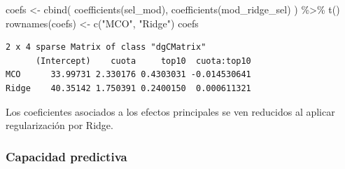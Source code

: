 \documentclass[
  letterpaper,
  DIV=11,
  numbers=noendperiod]{scrartcl}
\newenvironment{Shaded}{\begin{snugshade}}{\end{snugshade}}
\newcommand{\AttributeTok}[1]{\textcolor[rgb]{0.40,0.45,0.13}{#1}}
\newcommand{\DecValTok}[1]{\textcolor[rgb]{0.68,0.00,0.00}{#1}}
\newcommand{\FunctionTok}[1]{\textcolor[rgb]{0.28,0.35,0.67}{#1}}
\newcommand{\NormalTok}[1]{\textcolor[rgb]{0.00,0.23,0.31}{#1}}
\newcommand{\OtherTok}[1]{\textcolor[rgb]{0.00,0.23,0.31}{#1}}
\newcommand{\SpecialCharTok}[1]{\textcolor[rgb]{0.37,0.37,0.37}{#1}}
\newcommand{\StringTok}[1]{\textcolor[rgb]{0.13,0.47,0.30}{#1}}
\begin{document}
\begin{Shaded}
\begin{Highlighting}[]
\NormalTok{coefs }\OtherTok{\textless{}{-}} \FunctionTok{cbind}\NormalTok{(}
  \FunctionTok{coefficients}\NormalTok{(sel\_mod), }
  \FunctionTok{coefficients}\NormalTok{(mod\_ridge\_sel)}
\NormalTok{) }\SpecialCharTok{\%\textgreater{}\%} \FunctionTok{t}\NormalTok{()}
\FunctionTok{rownames}\NormalTok{(coefs) }\OtherTok{\textless{}{-}} \FunctionTok{c}\NormalTok{(}\StringTok{"MCO"}\NormalTok{, }\StringTok{"Ridge"}\NormalTok{)}
\NormalTok{coefs}
\end{Highlighting}
\end{Shaded}

\begin{verbatim}
2 x 4 sparse Matrix of class "dgCMatrix"
      (Intercept)    cuota     top10  cuota:top10
MCO      33.99731 2.330176 0.4303031 -0.014530641
Ridge    40.35142 1.750391 0.2400150  0.000611321
\end{verbatim}

Los coeficientes asociados a los efectos principales se ven reducidos al
aplicar regularización por Ridge.

\hypertarget{capacidad-predictiva}{%
\subsubsection{Capacidad predictiva}\label{capacidad-predictiva}}

\begin{Shaded}
\end{Shaded}
\end{document}
